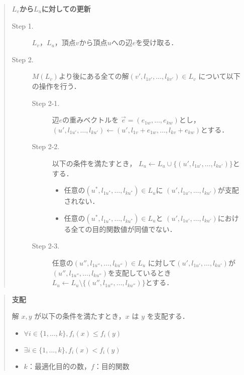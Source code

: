 \documentclass[12pt]{optlab-bachelor}
\begin{document}
\begin{quote}
  \textbf{$L_v$から$L_u$に対しての更新}
  \begin{description}
    \item[Step 1.] $L_v$，$L_u$，頂点$v$から頂点$u$への辺$e$を受け取る．
    \item[Step 2.] $M(L_v)$より後にある全ての解$(v',l_{1v'},\ldots,l_{kv'}) \in L_v$
    について以下の操作を行う．
    \begin{description}
      \item[Step 2-1.] 辺$e$の重みベクトルを
      $\vec{e} = (e_{1w},\ldots,e_{kw})$とし，
      $(u',l_{1u'},\ldots,l_{ku'}) \leftarrow
      (u',l_{1v}+e_{1w},\ldots,l_{kv}+e_{kw})$とする．
      \item[Step 2-2.] 以下の条件を満たすとき，
      $L_u \leftarrow L_u \cup \{(u',l_{1u'},\ldots,l_{ku'})\}$とする．
      \begin{itemize}
        \item 任意の$(u^*,l_{1u^*},\ldots,l_{ku^*})\in L_u$に
        $(u',l_{1u'},\ldots,l_{ku'})$が支配されない．
        \item 任意の$(u^*,l_{1u^*},\ldots,l_{ku^*}) \in L_u$と
        $(u',l_{1u'},\ldots,l_{ku'})$における全ての目的関数値が同値でない．
      \end{itemize}
      \item[Step 2-3.] 任意の$(u'',l_{1u''},\ldots,l_{ku''})\in L_u$
      に対して$(u',l_{1u'},\ldots,l_{ku'})$が
      $(u'',l_{1u''},\ldots,l_{ku''})$を支配しているとき
      $L_u \leftarrow L_u \setminus \{(u'',l_{1u''},\ldots,l_{ku''})\}$とする．
    \end{description}
  \end{description}
\end{quote}

\begin{quote}
  \textbf{支配}

    解 $x,y$ が以下の条件を満たすとき，$x$ は $y$ を支配する．
    \begin{itemize}
      \item $\forall i \in \{1,\ldots,k\},f_i(x) \le f_i(y)$
      \item $\exists i \in \{1,\ldots,k\},f_i(x) < f_i(y)$
      \item $k$：最適化目的の数，$f$：目的関数
    \end{itemize}
\end{quote}
\end{document}
